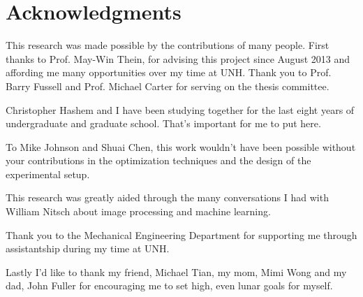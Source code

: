 \documentclass[12pt,a4paper]{book}
\begin{document}
\section*{Acknowledgments}
This research was made possible by the contributions of many people. First thanks to Prof. May-Win Thein, for advising this project since August 2013 and affording me many opportunities over my time at UNH.  Thank you to Prof. Barry Fussell and Prof. Michael Carter for serving on the thesis committee. 

Christopher Hashem and I have been studying together for the last eight years of undergraduate and graduate school.  That's important for me to put here.
  
To Mike Johnson and Shuai Chen, this work wouldn't have been possible without your contributions in the optimization techniques and the design of the experimental setup.

This research was greatly aided through the many conversations I had with William Nitsch about image processing and machine learning. 

Thank you to the Mechanical Engineering Department for supporting me through assistantship during my time at UNH.

Lastly I'd like to thank my friend, Michael Tian, my mom, Mimi Wong and my dad, John Fuller for encouraging me to set high, even lunar goals for myself.
\end{document}
